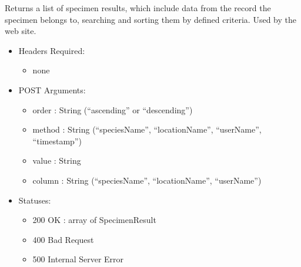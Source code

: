         Returns a list of specimen results, which include data from the record the specimen belongs to, searching and sorting them by defined criteria. Used by the web site.
        \begin{itemize}
            \item Headers Required:
            \begin{itemize}
                \item none
            \end{itemize}
            \item POST Arguments:
            \begin{itemize}
                \item order : String (``ascending'' or ``descending'')
                \item method : String (``speciesName'', ``locationName'', ``userName'', ``timestamp'')
                \item value : String
                \item column : String (``speciesName'', ``locationName'', ``userName'')
            \end{itemize}
            \item Statuses: 
            \begin{itemize}
                \item 200 OK : array of SpecimenResult
                \item 400 Bad Request
                \item 500 Internal Server Error
            \end{itemize}
        \end{itemize}

